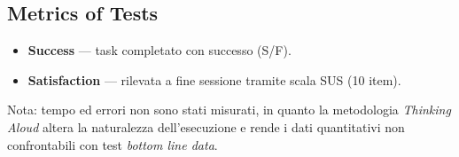 ﻿\documentclass[11pt,a4paper]{article}
\begin{document}
\subsection*{Metrics of Tests}
\begin{itemize}[leftmargin=*,itemsep=3pt]
  \item \textbf{Success} --- task completato con successo (S/F).
  \item \textbf{Satisfaction} --- rilevata a fine sessione
  tramite scala SUS (10 item).
\end{itemize}
\small Nota: tempo ed errori non sono stati misurati, in quanto
la metodologia \textit{Thinking Aloud} altera la naturalezza
dell'esecuzione e rende i dati quantitativi non confrontabili
con test \textit{bottom line data}.

\vspace{0.2cm}
\end{document}
